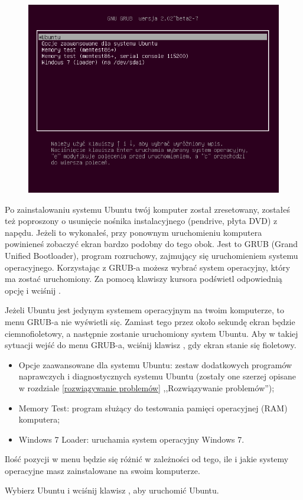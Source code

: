 \label{pierwsze_uruchomienie}
\begin{figure}
	\vspace{-10pt}
	\includegraphics[width=\linewidth]{images/pierwsze_uruchomienie_grub.png}
\end{figure}

Po zainstalowaniu systemu Ubuntu twój komputer został zresetowany, zostałeś też poproszony o usunięcie nośnika instalacyjnego (pendrive, płyta DVD) z napędu. Jeżeli to wykonałeś, przy ponownym uruchomieniu komputera powinieneś zobaczyć ekran bardzo podobny do tego obok. Jest to GRUB (\textcolor{ubuntu_orange}{Grand Unified Bootloader}), program rozruchowy, zajmujący się uruchomieniem systemu operacyjnego. Korzystając z GRUB-a możesz wybrać system operacyjny, który ma zostać uruchomiony. Za pomocą klawiszy kursora podświetl odpowiednią opcję i wciśnij \keys{\returnwin}.

Jeżeli Ubuntu jest jedynym systemem operacyjnym na twoim komputerze, to menu GRUB-a nie wyświetli się. Zamiast tego przez około sekundę ekran będzie ciemnofioletowy, a następnie zostanie uruchomiony system Ubuntu. Aby w takiej sytuacji wejść do menu GRUB-a, wciśnij klawisz , gdy ekran stanie się fioletowy.

\begin{itemize}
\item \textcolor{ubuntu_orange}{Opcje zaawansowane dla systemu Ubuntu}: zestaw dodatkowych programów naprawczych i diagnostycznych systemu Ubuntu (zostały one szerzej opisane w rozdziale \ref{rozwiązywanie problemów} ,,Rozwiązywanie problemów'');
\item \textcolor{ubuntu_orange}{Memory Test}: program służący do testowania pamięci operacyjnej (RAM) komputera;
\item \textcolor{ubuntu_orange}{Windows 7 Loader}: uruchamia system operacyjny Windows 7.
\end{itemize}

Ilość pozycji w menu będzie się różnić w zależności od tego, ile i jakie systemy operacyjne masz zainstalowane na swoim komputerze.

\begin{flushright}
Wybierz \textcolor{ubuntu_orange}{Ubuntu} i wciśnij klawisz \keys{\returnwin}, aby uruchomić Ubuntu.
\end{flushright}
\clearpage

